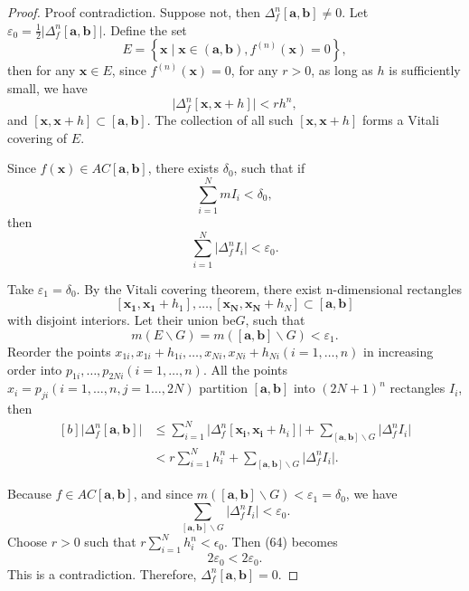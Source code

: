 \documentclass{ijclclp}
\begin{document}
\begin{proof}
    Proof contradiction. Suppose not, then \(\Delta_f^n[\boldsymbol{a},\boldsymbol{b}]\neq0\). Let \(\varepsilon_0=\frac{1}{2}\lvert\Delta_f^n[\boldsymbol{a},\boldsymbol{b}]\rvert\). Define the set 
    \[E=\left\{\boldsymbol{x}\mid \boldsymbol{x}\in(\boldsymbol{a},\boldsymbol{b}), f^{(n)}(\boldsymbol{x})=0\right\},\]
    then for any \(\boldsymbol{x}\in E\), since \(f^{(n)}(\boldsymbol{x})=0\), for any \(r>0\), as long as \(h\) is sufficiently small, we have
    \[\lvert\Delta_f^n[\boldsymbol{x},\boldsymbol{x}+h]\rvert<rh^n,\]
    and \([\boldsymbol{x},\boldsymbol{x}+h]\subset [\boldsymbol{a},\boldsymbol{b}]\).
    The collection of all such \([\boldsymbol{x},\boldsymbol{x}+h]\) forms a Vitali covering of \(E\).
    
    Since \(f(\boldsymbol{x})\in AC[\boldsymbol{a},\boldsymbol{b}]\), there exists \(\delta_0\), such that if
    \[\sum_{i=1}^NmI_i<\delta_0,\]
    then
    \[\sum_{i=1}^N\lvert\Delta_f^n I_i\rvert<\varepsilon_0.\]

    Take \(\varepsilon_1=\delta_0\). By the Vitali covering theorem, there exist n-dimensional rectangles
    \[[\boldsymbol{x_1},\boldsymbol{x_1}+h_1],\dots,[\boldsymbol{x_N},\boldsymbol{x_N}+h_N]\subset [\boldsymbol{a},\boldsymbol{b}]\]
    with disjoint interiors. 
    Let their union be\(G\), 
    such that
    \[m\left(E\backslash G\right)=m\left([\boldsymbol{a},\boldsymbol{b}]\backslash G\right)<\varepsilon_1.\]
    Reorder the points \(x_{1i},x_{1i}+h_{1i},\dots,x_{Ni},x_{Ni}+h_{Ni}(i=1,\dots,n)\) in increasing order into \(p_{1i},\dots,p_{2Ni}(i=1,\dots,n)\). All the points \(x_i=p_{ji}(i=1,\dots,n,j=1\dots,2N)\) partition \([\boldsymbol{a},\boldsymbol{b}]\) into \((2N+1)^n\)  rectangles \(I_i\), then
    \begin{equation}
        \begin{aligned}[b]
        \lvert\Delta_f^n[\boldsymbol{a},\boldsymbol{b}]\rvert&\leq\sum_{i=1}^N\lvert\Delta_f^n[\boldsymbol{x_i},\boldsymbol{x_i}+h_i]
        \rvert+\sum_{[\boldsymbol{a},\boldsymbol{b}]\backslash G}\lvert\Delta_f^nI_i\rvert\\
        &<r\sum_{i=1}^Nh_i^n+\sum_{[\boldsymbol{a},\boldsymbol{b}]\backslash G}\lvert\Delta_f^nI_i\rvert.
        \end{aligned}
    \end{equation}
    
    Because \(f\in AC[\boldsymbol{a},\boldsymbol{b}]\), and since \(m\left([\boldsymbol{a},\boldsymbol{b}]\backslash G\right)<\varepsilon_1=\delta_0\), we have 
    \[\sum_{[\boldsymbol{a},\boldsymbol{b}]\backslash G}\lvert\Delta_f^nI_i\rvert<\varepsilon_0.\]
    Choose \(r>0\) such that \(r\sum\limits_{i=1}^Nh_i^n<\epsilon_0\). Then (64) becomes 
    \[2\varepsilon_0<2\varepsilon_0.\]
    This is a contradiction. Therefore, \(\Delta_f^n[\boldsymbol{a},\boldsymbol{b}]=0\).
\end{proof}
\end{document}
